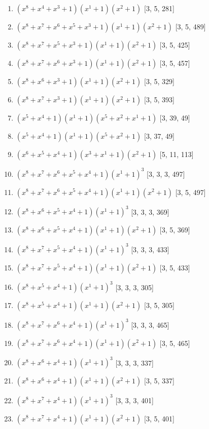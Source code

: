 \documentclass[10pt,twocolumn]{article}
\begin{document}
\begin{enumerate}
\item $(x^{8} + x^{4} + x^{3} + 1)(x^{1} + 1)(x^{2} + 1)$  [3, 5, 281]
\item $(x^{8} + x^{7} + x^{6} + x^{5} + x^{3} + 1)(x^{1} + 1)(x^{2} + 1)$  [3, 5, 489]
\item $(x^{8} + x^{7} + x^{5} + x^{3} + 1)(x^{1} + 1)(x^{2} + 1)$  [3, 5, 425]
\item $(x^{8} + x^{7} + x^{6} + x^{3} + 1)(x^{1} + 1)(x^{2} + 1)$  [3, 5, 457]
\item $(x^{8} + x^{6} + x^{3} + 1)(x^{1} + 1)(x^{2} + 1)$  [3, 5, 329]
\item $(x^{8} + x^{7} + x^{3} + 1)(x^{1} + 1)(x^{2} + 1)$  [3, 5, 393]
\item $(x^{5} + x^{4} + 1)(x^{1} + 1)(x^{5} + x^{2} + x^{1} + 1)$  [3, 39, 49]
\item $(x^{5} + x^{4} + 1)(x^{1} + 1)(x^{5} + x^{2} + 1)$  [3, 37, 49]
\item $(x^{6} + x^{5} + x^{4} + 1)(x^{3} + x^{1} + 1)(x^{2} + 1)$  [5, 11, 113]
\item $(x^{8} + x^{7} + x^{6} + x^{5} + x^{4} + 1)(x^{1} + 1)^{3}$  [3, 3, 3, 497]
\item $(x^{8} + x^{7} + x^{6} + x^{5} + x^{4} + 1)(x^{1} + 1)(x^{2} + 1)$  [3, 5, 497]
\item $(x^{8} + x^{6} + x^{5} + x^{4} + 1)(x^{1} + 1)^{3}$  [3, 3, 3, 369]
\item $(x^{8} + x^{6} + x^{5} + x^{4} + 1)(x^{1} + 1)(x^{2} + 1)$  [3, 5, 369]
\item $(x^{8} + x^{7} + x^{5} + x^{4} + 1)(x^{1} + 1)^{3}$  [3, 3, 3, 433]
\item $(x^{8} + x^{7} + x^{5} + x^{4} + 1)(x^{1} + 1)(x^{2} + 1)$  [3, 5, 433]
\item $(x^{8} + x^{5} + x^{4} + 1)(x^{1} + 1)^{3}$  [3, 3, 3, 305]
\item $(x^{8} + x^{5} + x^{4} + 1)(x^{1} + 1)(x^{2} + 1)$  [3, 5, 305]
\item $(x^{8} + x^{7} + x^{6} + x^{4} + 1)(x^{1} + 1)^{3}$  [3, 3, 3, 465]
\item $(x^{8} + x^{7} + x^{6} + x^{4} + 1)(x^{1} + 1)(x^{2} + 1)$  [3, 5, 465]
\item $(x^{8} + x^{6} + x^{4} + 1)(x^{1} + 1)^{3}$  [3, 3, 3, 337]
\item $(x^{8} + x^{6} + x^{4} + 1)(x^{1} + 1)(x^{2} + 1)$  [3, 5, 337]
\item $(x^{8} + x^{7} + x^{4} + 1)(x^{1} + 1)^{3}$  [3, 3, 3, 401]
\item $(x^{8} + x^{7} + x^{4} + 1)(x^{1} + 1)(x^{2} + 1)$  [3, 5, 401]

\end{enumerate}
\end{document}
